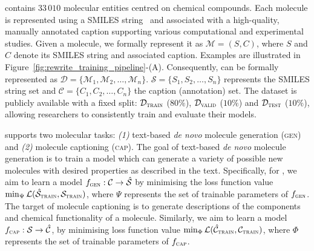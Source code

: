 \olddataset contains $33\,010$ molecular entities centred on chemical compounds. 
Each molecule is represented using a SMILES string~\cite{W88} and associated with a high-quality, manually annotated caption supporting various computational and experimental studies.
% 
Given a molecule, we formally represent it as $\mathcal{M} = (S, C)$, where $S$ and $C$ denote its SMILES string and associated caption. 
Examples are illustrated in Figure~\ref{fig:rewrite_training_pipeline}-(A). 
% 
Consequently, \olddataset can be formally represented as $\mathcal{D} = \{ \mathcal{M}_1, \mathcal{M}_2, \dots, \mathcal{M}_n \}$. 
$\mathcal{S} = \{ S_1, S_2, \dots, S_n \}$ represents the SMILES string set and $\mathcal{C} = \{ C_1, C_2, \dots, C_n \}$ the caption (annotation) set.
% 
The dataset is publicly available with a fixed split: $\mathcal{D}_{\textsc{train}}$ ($80\%$), $\mathcal{D}_{\textsc{valid}}$ ($10\%$) and $\mathcal{D}_{\textsc{test}}$ ($10\%$), allowing researchers to consistently train and evaluate their models.

\olddataset supports two molecular tasks: \emph{(1)} text-based \emph{de novo} molecule generation (\textsc{gen}) and \emph{(2)} molecule captioning (\textsc{cap}). 
% 
The goal of text-based \emph{de novo} molecule generation is to train a model which can generate a variety of possible new molecules with desired properties as described in the text. 
% 
Specifically, for \olddataset, we aim to learn a model $f_{\textsc{gen}}: \mathcal{C} \to \hat{\mathcal{S}} $ by minimising the loss function value $\min_{\Psi} \mathcal{L}(\hat{\mathcal{S}}_{\textsc{train}}, \mathcal{S}_{\textsc{train}})$, where $\Psi$ represents the set of trainable parameters of $f_{\textsc{gen}}$. 
% 
The target of molecule captioning is to generate descriptions of the components and chemical functionality of a molecule. 
Similarly, we aim to learn a model $f_{\textsc{cap}}: \mathcal{S} \to \hat{\mathcal{C}} $, by minimising loss function value $\min_{\Phi} \mathcal{L}(\hat{\mathcal{C}}_{\textsc{train}}, \mathcal{C}_{\textsc{train}})$, where $\Phi$ represents the set of trainable parameters of $f_{\textsc{cap}}$. 

